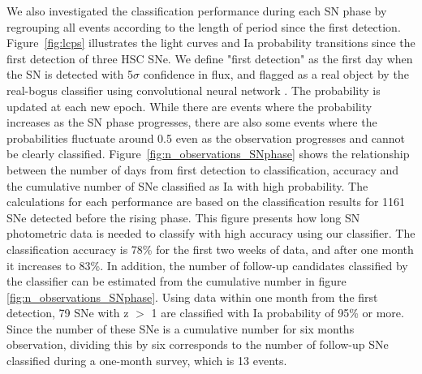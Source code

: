 \documentclass[useamsfonts]{pasj01}
\begin{document}
We also investigated the classification performance during each SN phase by regrouping all events according to the length of period since the first detection.
Figure\ \ref{fig:lcps} illustrates the light curves and Ia probability transitions since the first detection of three HSC SNe.
We define "first detection" as the first day when the SN is detected with 5$\sigma$ confidence in flux, and flagged as a real object by the real-bogus classifier using convolutional neural network \citep{yasuda19a}.
The probability is updated at each new epoch.
While there are events where the probability increases as the SN phase progresses, there are also some events where the probabilities fluctuate around 0.5 even as the observation progresses and cannot be clearly classified.
Figure\ \ref{fig:n_observations_SNphase} shows the relationship between the number of days from first detection to classification, accuracy and the cumulative number of SNe classified as Ia with high probability.
The calculations for each performance are based on the classification results for 1161 SNe detected before the rising phase.
This figure presents how long SN photometric data is needed to classify with high accuracy using our classifier.
The classification accuracy is 78\% for the first two weeks of data, and after one month it increases to 83\%.
In addition, the number of follow-up candidates classified by the classifier can be estimated from the cumulative number in figure \ref{fig:n_observations_SNphase}.
Using data within one month from the first detection, 79 SNe with z $>$ 1 are classified with Ia probability of 95\% or more.
Since the number of these SNe is a cumulative number for six months observation, dividing this by six corresponds to the number of follow-up SNe classified during a one-month survey, which is 13 events.
\end{document}

